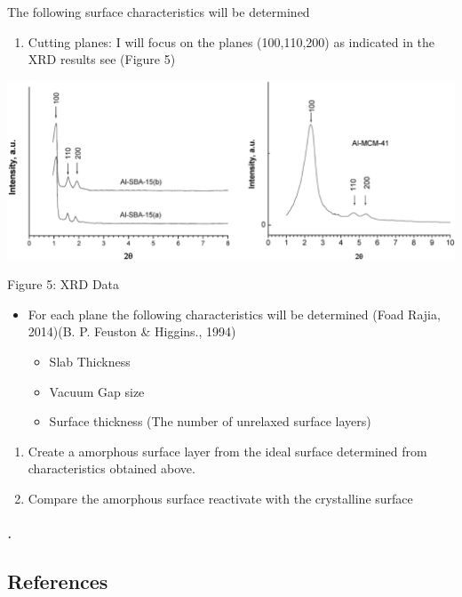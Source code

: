 \documentclass[]{article}
\providecommand{\tightlist}{%
  \setlength{\itemsep}{0pt}\setlength{\parskip}{0pt}}
\let\oldsubparagraph\subparagraph
\renewcommand{\subparagraph}[1]{\oldsubparagraph{#1}\mbox{}}
\begin{document}
The following surface characteristics will be determined

\begin{enumerate}
\def\labelenumi{\arabic{enumi}.}
\tightlist
\item
  Cutting planes: I will focus on the planes (100,110,200) as indicated
  in the XRD results see (Figure 5)
\end{enumerate}

\begin{center}\includegraphics[width=0.9\linewidth]{../Report1/DATA/planes} \end{center}

Figure 5: XRD Data

\begin{itemize}
\item
  For each plane the following characteristics will be determined (Foad
  Rajia, 2014)(B. P. Feuston \& Higgins., 1994)

  \begin{itemize}
  \item
    Slab Thickness
  \item
    Vacuum Gap size
  \item
    Surface thickness (The number of unrelaxed surface layers)
  \end{itemize}
\end{itemize}

\begin{enumerate}
\def\labelenumi{\arabic{enumi}.}
\setcounter{enumi}{1}
\item
  Create a amorphous surface layer from the ideal surface determined
  from characteristics obtained above.
\item
  Compare the amorphous surface reactivate with the crystalline surface
\end{enumerate}

\hypertarget{section-4}{%
\subparagraph{.}\label{section-4}}

\hypertarget{references}{%
\subsection*{References}\label{references}}
\end{document}
